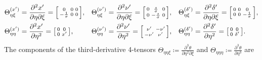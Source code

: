 \documentclass{article}
\begin{document}
\begin{align}
  \Theta_{\eta\xi}^{(x')}                                                                                           & = \frac{\partial^2 x'}{\partial \eta \partial \xi} = \begin{bsmallmatrix} 0 & 0 & 0 \\ -\frac{1}{\sigma} & 0 & 0 \end{bsmallmatrix}, &   &
  \Theta_{\eta\xi}^{(\nu')} = \frac{\partial^2 \nu'}{\partial \eta \partial \xi} = \begin{bsmallmatrix} 0 & \frac{s}{\sigma} & 0 \\ 0 & -\frac{s}{\sigma} & 0 \end{bsmallmatrix}, &                                                                                       &
  \Theta_{\eta\xi}^{(\delta')} = \frac{\partial^2 \delta'}{\partial \eta \partial \xi} = \begin{bsmallmatrix} 0 & 0 & 0 \\ 0 & 0 & -\frac{1}{\sigma} \end{bsmallmatrix},                                                                                         \\
  \Theta_{\eta\eta}^{(x')}                                                                                          & = \frac{\partial^2 x'}{\partial \eta^2} = \begin{bsmallmatrix} 0 & 0 \\ 0 & x' \end{bsmallmatrix},            &   &
  \Theta_{\eta\eta}^{(\nu')} = \frac{\partial^2 \nu'}{\partial \eta^2} = \begin{bsmallmatrix} \nu' & -\nu' \\ -\nu' & \nu' \end{bsmallmatrix},           &                                                                                       &
  \Theta_{\eta\eta}^{(\delta')} = \frac{\partial^2 \delta'}{\partial \eta^2} = \begin{bsmallmatrix} 0 & 0 \\ 0 & \delta' \end{bsmallmatrix}.
\end{align}
%
The components of the third-derivative 4-tensors
$\Theta_{\eta\eta\xi} \coloneqq \frac{\partial^3 \theta}{\partial \eta^2 \partial \xi}$ and $\Theta_{\eta\eta\eta} \coloneqq \frac{\partial^3 \theta}{\partial \eta^3}$ are
%
\end{document}
